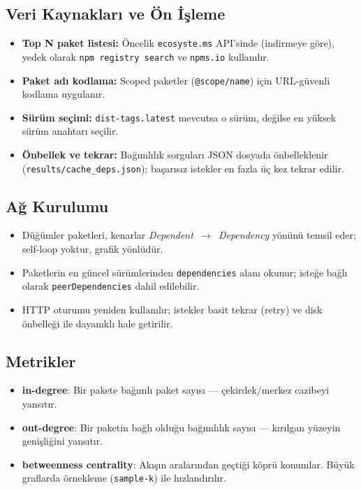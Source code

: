 \documentclass[11pt,a4paper]{article}
\begin{document}
\subsection{Veri Kaynakları ve Ön İşleme}
\begin{itemize}
  \item \textbf{Top N paket listesi:} Öncelik \texttt{ecosyste.ms} API’sinde (indirmeye göre), yedek olarak \texttt{npm registry search} ve \texttt{npms.io} kullanılır.
  \item \textbf{Paket adı kodlama:} Scoped paketler (\texttt{@scope/name}) için URL-güvenli kodlama uygulanır.
  \item \textbf{Sürüm seçimi:} \texttt{dist-tags.latest} mevcutsa o sürüm, değilse en yüksek sürüm anahtarı seçilir.
  \item \textbf{Önbellek ve tekrar:} Bağımlılık sorguları JSON dosyada önbelleklenir (\texttt{results/cache\_deps.json}); başarısız istekler en fazla üç kez tekrar edilir.
\end{itemize}

\subsection{Ağ Kurulumu}
\begin{itemize}
  \item Düğümler paketleri, kenarlar \emph{Dependent~$\to$~Dependency} yönünü temsil eder; self-loop yoktur, grafik yönlüdür.
  \item Paketlerin en güncel sürümlerinden \texttt{dependencies} alanı okunur; isteğe bağlı olarak \texttt{peerDependencies} dahil edilebilir.
  \item HTTP oturumu yeniden kullanılır; istekler basit tekrar (retry) ve disk önbelleği ile dayanıklı hale getirilir.
\end{itemize}

\subsection{Metrikler}
\begin{itemize}
  \item \textbf{in-degree}: Bir pakete bağımlı paket sayısı — çekirdek/merkez cazibeyi yansıtır.
  \item \textbf{out-degree}: Bir paketin bağlı olduğu bağımlılık sayısı — kırılgan yüzeyin genişliğini yansıtır.
  \item \textbf{betweenness centrality}: Akışın aralarından geçtiği köprü konumlar. Büyük graflarda örnekleme (\texttt{sample-k}) ile hızlandırılır.
\end{itemize}
\end{document}
